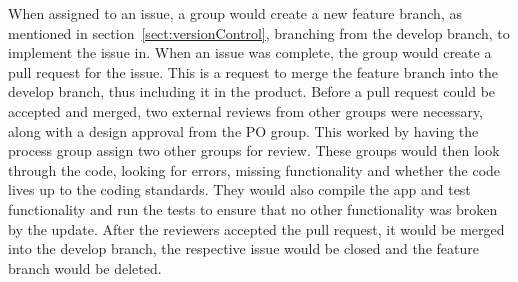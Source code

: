 When assigned to an issue, a group would create a new feature branch, as mentioned in section~\ref{sect:versionControl}, branching from the develop branch, to implement the issue in.
When an issue was complete, the group would create a pull request for the issue. This is a request to merge the feature branch into the develop branch, thus including it in the product. 
Before a pull request could be accepted and merged, two external reviews from other groups were necessary, along with a design approval from the PO group. This worked by having the process group assign two other groups for review. These groups would then look through the code, looking for errors, missing functionality and whether the code lives up to the coding standards. They would also compile the app and test functionality and run the tests to ensure that no other functionality was broken by the update.
After the reviewers accepted the pull request, it would be merged into the develop branch, the respective issue would be closed and the feature branch would be deleted. 
